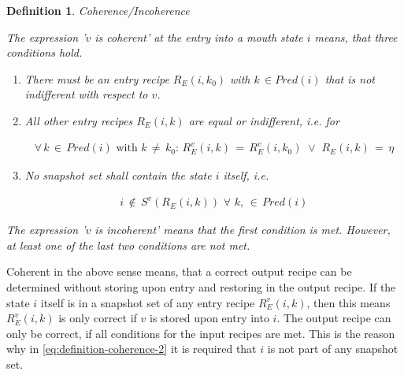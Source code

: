\documentclass[12pt,a4paper]{scrartcl}
\newtheorem{definition}{Definition}
\begin{document}
\begin{definition} Coherence/Incoherence

    The expression '$v$ is coherent' at the entry into a mouth state $i$
    means, that three conditions hold. 

    \begin{enumerate}

    \item There must be an entry recipe $R_E(i,k_0)$ with $k\,\in Pred(i)$ 
          that is not indifferent with respect to $v$.

    \item All other entry recipes $R_E(i,k)$ are equal or indifferent, i.e. for 

        \begin{equation} \label{eq:definition-coherence}
            \begin{aligned}
                \forall\,k\,\in\,Pred(i)\,\,\mbox{with}\,\,k\,\neq\,k_0:\,R_E^v(i,k)\,=\,R_E^v(i,k_0)\,\,\vee\,\,R_E(i,k)\,=\,\eta
            \end{aligned}
        \end{equation}
        
    \item No snapshot set shall contain the state $i$ itself, i.e.

        \begin{equation} \label{eq:definition-coherence-2}
            \begin{aligned}
                i\,\notin\,S^v(R_E(i,k))\,\,\forall\,\,k,\,\in\,Pred(i)
            \end{aligned}
        \end{equation}

    \end{enumerate}
    
    The expression '$v$ is incoherent' means that the first condition is met.
    However, at least one of the last two conditions are not met.

\end{definition}

Coherent in the above sense means, that a correct output recipe can be
determined without storing upon entry and restoring in the output recipe. If
the state $i$ itself is in a snapshot set of any entry recipe $R^v_E(i,k)$,
then this means $R^v_E(i,k)$ is only correct if $v$ is stored upon entry into
$i$. The output recipe can only be correct, if all conditions for the input
recipes are met. This is the reason why in \eqref{eq:definition-coherence-2} 
it is required that $i$ is not part of any snapshot set.
\end{document}
